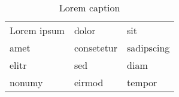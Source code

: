 ﻿\documentclass{article}
\begin{document}
\begin{table}[]
\centering
\caption{Lorem caption}
\label{tab:caption}
\begin{tabular}{lll}
Lorem ipsum & dolor & sit \\
amet & consetetur & sadipscing \\
elitr & sed & diam \\
nonumy & eirmod & tempor
\end{tabular}
\end{table}
\end{document}
